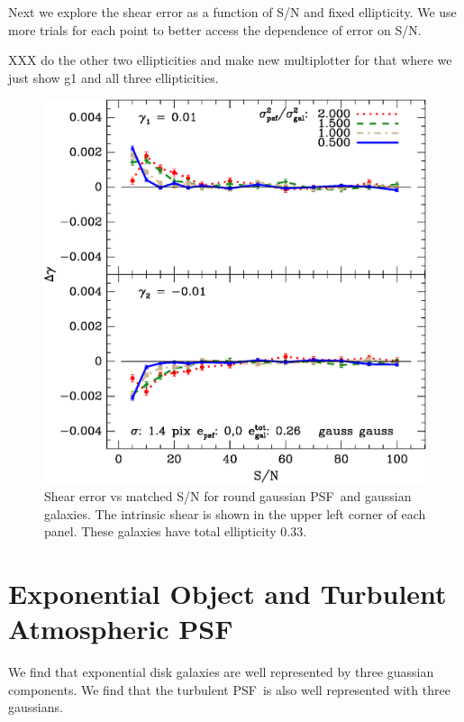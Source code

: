 \documentclass[10pt,preprint]{aastex}
\newcommand{\psf}{PSF}
\begin{document}
Next we explore the shear error as a function of S/N and fixed ellipticity.  We
use more trials for each point to better access the dependence of error on S/N.

XXX do the other two ellipticities and make new multiplotter for that
where we just show g1 and all three ellipticities.

\begin{figure}[h] \centering
\includegraphics[scale=0.7]{figures/gmix-fit-gg05r14-yr-0.005-0.005-diff.eps}

 \caption{Shear error vs matched S/N for round gaussian \psf\ and gaussian
 galaxies. The intrinsic shear is shown in the upper left corner of each panel.
 These galaxies have total ellipticity 0.33.
 \label{fig:gg05r14}}

\end{figure}


\section{Exponential Object and Turbulent Atmospheric \psf}

We find that exponential disk galaxies are well represented by three guassian
components.  We find that the turbulent \psf\ is also well represented with
three gaussians.
\end{document}
